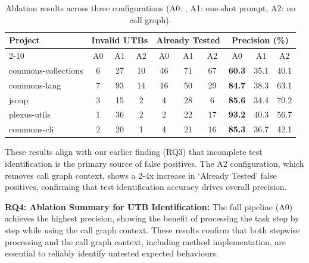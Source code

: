\begin{table}[h]
\centering
\caption{Ablation results across three configurations (A0: \toolname, A1: one-shot prompt, A2: no call graph).}
\label{tab:ablation-results}
\begin{tabular}{lccccccccc}
\toprule
\multirow{2}{*}{\textbf{Project}} 
& \multicolumn{3}{c}{\textbf{Invalid UTBs}} 
& \multicolumn{3}{c}{\textbf{Already Tested}} 
& \multicolumn{3}{c}{\textbf{Precision (\%)}} \\ \cline{2-10} 
& A0 & A1 & A2 & A0 & A1 & A2 & A0 & A1 & A2\\ \hline
commons-collections & 6  & 27 & 10 & 46 & 71 & 67 & \textbf{60.3} & 35.1 & 40.1 \\
commons-lang        & 7  & 93 & 14 & 16 & 50 & 29 & \textbf{84.7} & 38.3 & 63.1 \\
jsoup               & 3  & 15 & \hphantom{1}2 & \hphantom{1}4 & 28 & \hphantom{1}6 & \textbf{85.6} & 34.4 & 70.2 \\
plexus-utils        & 1  & 36 & \hphantom{1}2 & \hphantom{1}2 & 22 & 17 & \textbf{93.2} & 40.3 & 56.7 \\
commons-cli         & 2  & 20 & \hphantom{1}1 & \hphantom{1}4 & 21 & 16 & \textbf{85.3} & 36.7 & 42.1 \\ \bottomrule
\end{tabular}
\end{table}

These results align with our earlier finding (RQ3) that incomplete test identification is the primary source of false positives. The A2 configuration, which removes call graph context, shows a 2-4x increase in `Already Tested' false positives, confirming that test identification accuracy drives overall precision.

\begin{tcolorbox}[colback=gray!10!white, colframe=black, boxrule=0.5pt]\textbf{RQ4: Ablation Summary for UTB Identification:}
The full pipeline (A0) achieves the highest precision, showing the benefit of processing the task step by step while using the call graph context. 
These results confirm that both stepwise processing and the call graph context, including method implementation, are essential to reliably identify untested expected behaviours.
\end{tcolorbox}

